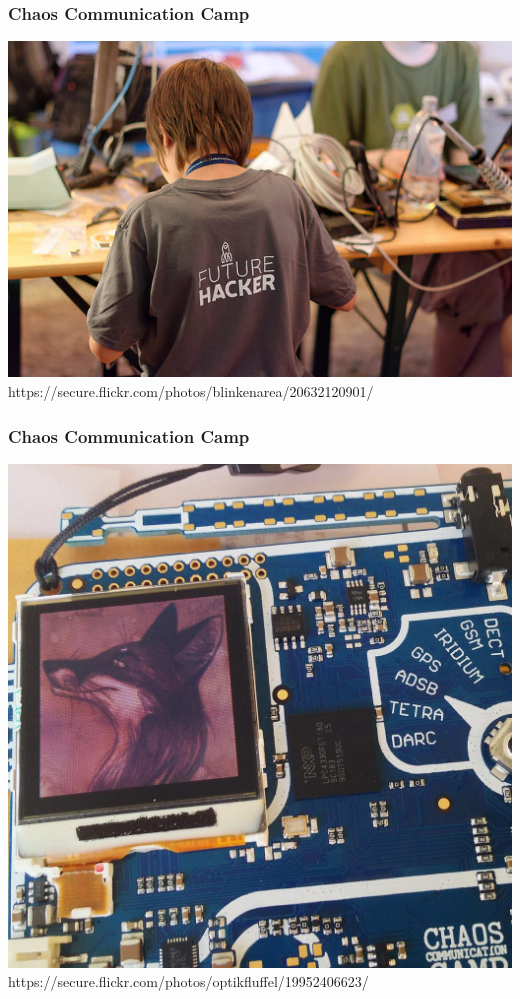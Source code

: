 \documentclass[12pt]{beamer}
\newcommand{\license}[2][]{\\#2\ifthenelse{\equal{#1}{}}{}{\\\scriptsize\url{#1}}}
\begin{document}
	\begin{frame}
		\frametitle{Chaos Communication Camp}
		\begin{minipage}{\linewidth}
			\centering
			\includegraphics[height=0.7\textheight]{img//camp2015-future-hacker.jpg}
			\tiny\license{https://secure.flickr.com/photos/blinkenarea/20632120901/}
		\end{minipage}
	\end{frame}
	\begin{frame}
		\frametitle{Chaos Communication Camp}
		\begin{minipage}{\linewidth}
			\centering
			\includegraphics[height=0.7\textheight]{img//camp2015-badge.jpg}
			\tiny\license{https://secure.flickr.com/photos/optikfluffel/19952406623/}
		\end{minipage}
	\end{frame}
\end{document}
